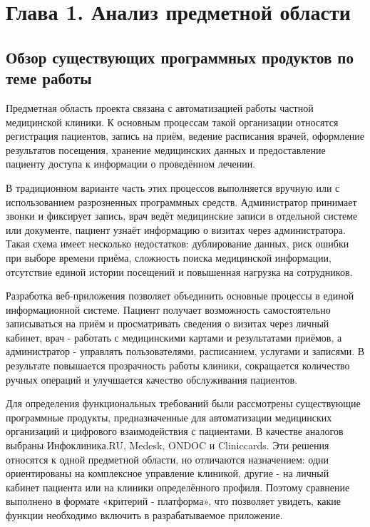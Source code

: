
\section*{Глава 1. Анализ предметной области}

\subsection{Обзор существующих программных продуктов по теме работы}

Предметная область проекта связана с автоматизацией работы частной медицинской клиники. К основным процессам такой организации относятся регистрация пациентов, запись на приём, ведение расписания врачей, оформление результатов посещения, хранение медицинских данных и предоставление пациенту доступа к информации о проведённом лечении.

В традиционном варианте часть этих процессов выполняется вручную или с использованием разрозненных программных средств. Администратор принимает звонки и фиксирует запись, врач ведёт медицинские записи в отдельной системе или документе, пациент узнаёт информацию о визитах через администратора. Такая схема имеет несколько недостатков: дублирование данных, риск ошибки при выборе времени приёма, сложность поиска медицинской информации, отсутствие единой истории посещений и повышенная нагрузка на сотрудников.

Разработка веб-приложения позволяет объединить основные процессы в единой информационной системе. Пациент получает возможность самостоятельно записываться на приём и просматривать сведения о визитах через личный кабинет, врач - работать с медицинскими картами и результатами приёмов, а администратор - управлять пользователями, расписанием, услугами и записями. В результате повышается прозрачность работы клиники, сокращается количество ручных операций и улучшается качество обслуживания пациентов.

Для определения функциональных требований были рассмотрены существующие программные продукты, предназначенные для автоматизации медицинских организаций и цифрового взаимодействия с пациентами. В качестве аналогов выбраны Инфоклиника.RU, Medesk, ONDOC и Cliniccards. Эти решения относятся к одной предметной области, но отличаются назначением: одни ориентированы на комплексное управление клиникой, другие - на личный кабинет пациента или на клиники определённого профиля. Поэтому сравнение выполнено в формате «критерий - платформа», что позволяет увидеть, какие функции необходимо включить в разрабатываемое приложение.


